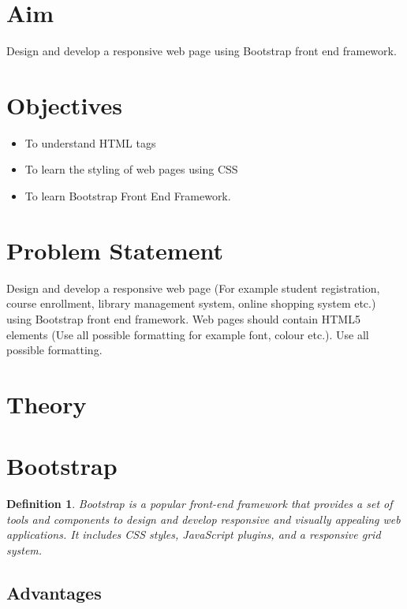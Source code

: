 \documentclass[11pt]{article}
\newtheorem{dfn}[thm]{Definition}
\begin{document}
\tableofcontents
\thispagestyle{empty}
\clearpage

\setcounter{page}{1}

\section{Aim}
Design and develop a responsive web page using Bootstrap front end framework.

\section{Objectives}
\begin{itemize}
    \item To understand HTML tags
    \item To learn the styling of web pages using CSS
    \item To learn Bootstrap Front End Framework.
\end{itemize}

\section{Problem Statement}
Design and develop a responsive web page (For example student registration, course enrollment,
library management system, online shopping system etc.) using Bootstrap front end framework.
Web pages should contain HTML5 elements (Use all possible formatting for example font,
colour etc.). Use all possible formatting.



\section{Theory}

\section{Bootstrap}

\begin{dfn}
    Bootstrap is a popular front-end framework that provides a set of tools and components to design and develop responsive and visually appealing web applications. It includes CSS styles, JavaScript plugins, and a responsive grid system.
\end{dfn}

\subsection{Advantages}
\end{document}
